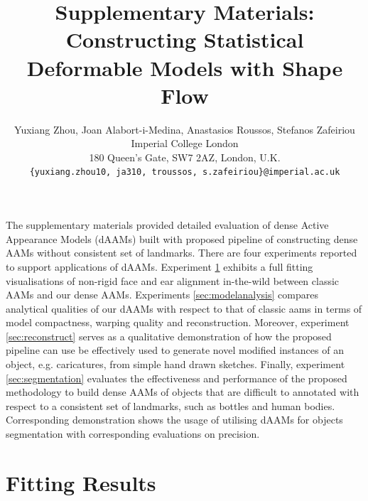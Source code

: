 






\title{Supplementary Materials: Constructing Statistical Deformable Models with Shape Flow}

\author{Yuxiang Zhou, Joan Alabort-i-Medina, Anastasios Roussos, Stefanos Zafeiriou\\
Imperial College London\\
180 Queen’s Gate, SW7 2AZ, London, U.K.\\
{\tt\small \{yuxiang.zhou10, ja310, troussos, s.zafeiriou\}@imperial.ac.uk}}
\maketitle
\thispagestyle{empty}

The supplementary materials provided detailed evaluation of dense Active Appearance Models (dAAMs) built with proposed pipeline of constructing dense AAMs without consistent set of landmarks. There are four experiments reported to support applications of dAAMs. Experiment \ref{sec:fittingresults} exhibits a full fitting visualisations of non-rigid face and ear alignment in-the-wild between classic AAMs and our dense AAMs. Experiments \ref{sec:modelanalysis} compares analytical qualities of our dAAMs with respect to that of classic aams in terms of model compactness, warping quality and reconstruction.
Moreover, experiment \ref{sec:reconstruct} serves as a qualitative demonstration of how the proposed pipeline can use be effectively used to generate novel modified instances of an object, e.g. caricatures, from simple hand drawn sketches.
Finally, experiment \ref{sec:segmentation} evaluates the effectiveness and performance of the proposed methodology to build dense AAMs of objects that are difficult to annotated with respect to a consistent set of landmarks, such as bottles and human bodies. Corresponding demonstration shows the usage of utilising dAAMs for objects segmentation with corresponding evaluations on precision.

\appendix
\section{Fitting Results}
\label{sec:fittingresults}

